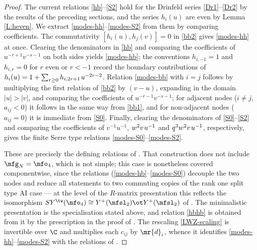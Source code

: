 \documentclass{amsart}
\numberwithin{equation}{section}
\theoremstyle{remark}
\renewcommand{\,}{\kern 0.1em} %
\begin{document}
\begin{proof}
%
The current relations \eqref{hb}--\eqref{S2} hold for the Drinfeld series \eqref{Dr1}--\eqref{Dr2} by the results of the preceding sections, and the series $h_i(u)$ are even by Lemma \ref{L:heven}. We extract \eqref{modes-hh}--\eqref{modes-S2} from them by comparing coefficients. The commutativity $[h_i(u),h_j(v)]=0$ in \eqref{bb2} gives \eqref{modes-hh} at once. Clearing the denominators in \eqref{hb} and comparing the coefficients of $u^{-r+1}v^{-s-1}$ on both sides yields \eqref{modes-hb}; the conventions $h_{i,-1}=1$ and $h_{i,r}=0$ for $r$ even or $r<-1$ record the boundary contributions of $h_i(u)=1+\sum_{r\ge0}h_{i,2r+1}\,u^{-2r-2}$. Relation \eqref{modes-bb} with $i=j$ follows by multiplying the first relation of \eqref{bb2} by $(v-u)$, expanding in the domain $|u|>|v|$, and comparing the coefficients of $u^{-r-1}v^{-s-1}$; for adjacent nodes ($i\ne j$, $a_{ij}<0$) it follows in the same way from \eqref{bb1}, and for non-adjacent nodes ($a_{ij}=0$) it is immediate from \eqref{S0}. Finally, clearing the denominators of \eqref{S0}--\eqref{S2} and comparing the coefficients of $v^{-1}u^{-1}$, $w^{2}v\,u^{-1}$ and $q^{3}w^{2}v\,u^{-1}$, respectively, gives the finite Serre type relations \eqref{modes-S0}--\eqref{modes-S2}.

These are precisely the defining relations of \cite[Def.~2.7]{Lu26a}. That construction does not include $\mfg_N=\mfo_4$, which is not simple; this case is nonetheless covered componentwise, since the relations (\ref{modes-hb}--\ref{modes-S0}) decouple the two nodes and reduce all statements to two commuting copies of the rank one split type AI case --- at the level of the $R$-matrix presentation this reflects the isomorphism $SY^{\tw}(\mfo_4) \cong Y^+(\mfsl_2) \ot Y^+(\mfsl_2)$ of \cite[Cor.~4.18]{GRW18}. The minimalistic presentation is the specialisation stated above, and relation \eqref{hbhb} is obtained from it by the prescription in the proof of \cite[Lem.~2.9]{Lu26a}. The rescaling \eqref{LWZ-scaling} is invertible over $\C$ and multiplies each $c_{ij}$ by $\mr{d}_i$, whence it identifies \eqref{modes-hh}--\eqref{modes-S2} with the relations of \cite[Thm.~4.14]{LWZ25b}.
\end{proof}
\end{document}
